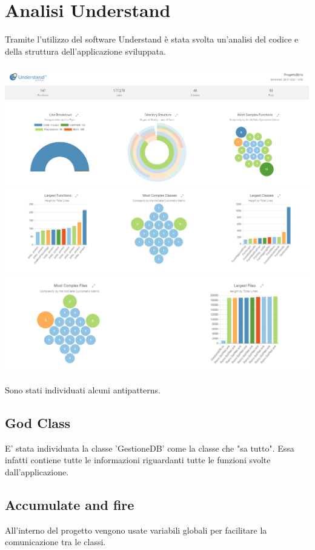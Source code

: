 \documentclass[a4paper, titlepage]{article}
\begin{document}
\section{Analisi Understand}
Tramite l'utilizzo del software Understand è stata svolta un'analisi del codice e della struttura dell'applicazione sviluppata.\\\\
\includegraphics[scale=0.40]{Immagini/Understand_1.png}\\
\includegraphics[scale=0.40]{Immagini/Understand_3.png}\\
\includegraphics[scale=0.40]{Immagini/Understand_2.png}\\
\\Sono stati individuati alcuni antipatterns.
\subsection{God Class}
E' stata individuata la classe 'GestioneDB' come la classe che "sa tutto". Essa infatti contiene tutte le informazioni riguardanti tutte le funzioni svolte dall'applicazione.
\subsection{Accumulate and fire}
All'interno del progetto vengono usate variabili globali per facilitare la comunicazione tra le classi.
\end{document}
